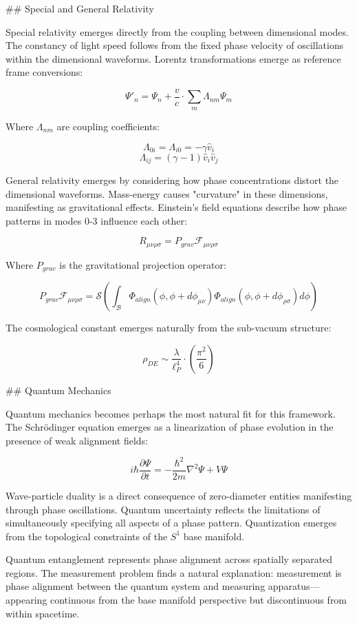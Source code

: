 ## Special and General Relativity

Special relativity emerges directly from the coupling between dimensional modes. The constancy of light speed follows from the fixed phase velocity of oscillations within the dimensional waveforms. Lorentz transformations emerge as reference frame conversions:

$$\Psi'_n = \Psi_n + \frac{v}{c} \cdot \sum_m \Lambda_{nm}\Psi_m$$

Where $\Lambda_{nm}$ are coupling coefficients:

$$\Lambda_{0i} = \Lambda_{i0} = -\gamma\hat{v}_i$$
$$\Lambda_{ij} = (\gamma-1)\hat{v}_i\hat{v}_j$$

General relativity emerges by considering how phase concentrations distort the dimensional waveforms. Mass-energy causes "curvature" in these dimensions, manifesting as gravitational effects. Einstein's field equations describe how phase patterns in modes 0-3 influence each other:

$$R_{\mu\nu\rho\sigma} = P_{grav}\mathcal{F}_{\mu\nu\rho\sigma}$$

Where $P_{grav}$ is the gravitational projection operator:

$$P_{grav}\mathcal{F}_{\mu\nu\rho\sigma} = \mathcal{S}\left(\int_{\mathcal{B}} \Phi_{align}(\phi,\phi+d\phi_{\mu\nu})\Phi_{align}(\phi,\phi+d\phi_{\rho\sigma}) d\phi\right)$$

The cosmological constant emerges naturally from the sub-vacuum structure:

$$\rho_{DE} \sim \frac{\lambda}{\ell_P^4} \cdot \left(\frac{\pi^2}{6}\right)$$

## Quantum Mechanics

Quantum mechanics becomes perhaps the most natural fit for this framework. The Schrödinger equation emerges as a linearization of phase evolution in the presence of weak alignment fields:

$$i\hbar\frac{\partial\Psi}{\partial t} = -\frac{\hbar^2}{2m}\nabla^2\Psi + V\Psi$$

Wave-particle duality is a direct consequence of zero-diameter entities manifesting through phase oscillations. Quantum uncertainty reflects the limitations of simultaneously specifying all aspects of a phase pattern. Quantization emerges from the topological constraints of the $S^1$ base manifold.

Quantum entanglement represents phase alignment across spatially separated regions. The measurement problem finds a natural explanation: measurement is phase alignment between the quantum system and measuring apparatus—appearing continuous from the base manifold perspective but discontinuous from within spacetime.

